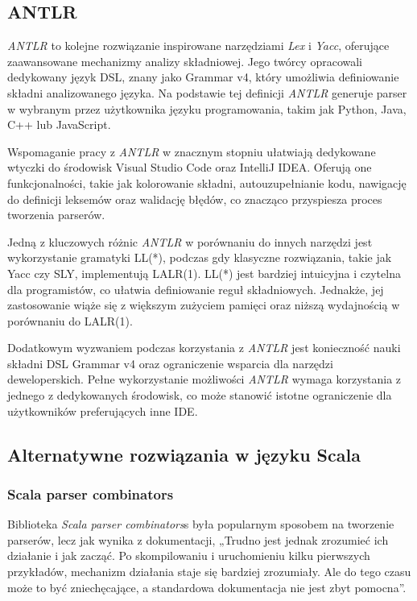 \subsection{ANTLR}
\label{sec:antlr}

\textit{ANTLR} to kolejne rozwiązanie inspirowane narzędziami \textit{Lex} i \textit{Yacc}, oferujące zaawansowane mechanizmy analizy składniowej. Jego twórcy opracowali dedykowany język DSL, znany jako Grammar v4, który umożliwia definiowanie składni analizowanego języka. Na podstawie tej definicji \textit{ANTLR} generuje parser w wybranym przez użytkownika języku programowania, takim jak Python, Java, C++ lub JavaScript.

Wspomaganie pracy z \textit{ANTLR} w znacznym stopniu ułatwiają dedykowane wtyczki do środowisk Visual Studio Code oraz IntelliJ IDEA. Oferują one funkcjonalności, takie jak kolorowanie składni, autouzupełnianie kodu, nawigację do definicji leksemów oraz walidację błędów, co znacząco przyspiesza proces tworzenia parserów.

Jedną z kluczowych różnic \textit{ANTLR} w porównaniu do innych narzędzi jest wykorzystanie gramatyki LL(*), podczas gdy klasyczne rozwiązania, takie jak Yacc czy SLY, implementują LALR(1). LL(*) jest bardziej intuicyjna i czytelna dla programistów, co ułatwia definiowanie reguł składniowych. Jednakże, jej zastosowanie wiąże się z większym zużyciem pamięci oraz niższą wydajnością w porównaniu do LALR(1).

Dodatkowym wyzwaniem podczas korzystania z \textit{ANTLR} jest konieczność nauki składni DSL Grammar v4 oraz ograniczenie wsparcia dla narzędzi deweloperskich. Pełne wykorzystanie możliwości \textit{ANTLR} wymaga korzystania z jednego z dedykowanych środowisk, co może stanowić istotne ograniczenie dla użytkowników preferujących inne IDE.


\subsection{Alternatywne rozwiązania w języku Scala}
\label{sec:rozwiazania-w-jezyku-scal}


\subsubsection{Scala parser combinators}
\label{sec:scala-parser-combinators}

Biblioteka \textit{Scala parser combinators}s\cite{moors2008parser} była popularnym sposobem na tworzenie parserów, lecz jak wynika z dokumentacji, „Trudno jest jednak zrozumieć ich działanie i jak zacząć. Po skompilowaniu i uruchomieniu kilku pierwszych przykładów, mechanizm działania staje się bardziej zrozumiały. Ale do tego czasu może to być zniechęcające, a standardowa dokumentacja nie jest zbyt pomocna”\cite{parser-combinators-readme}.

